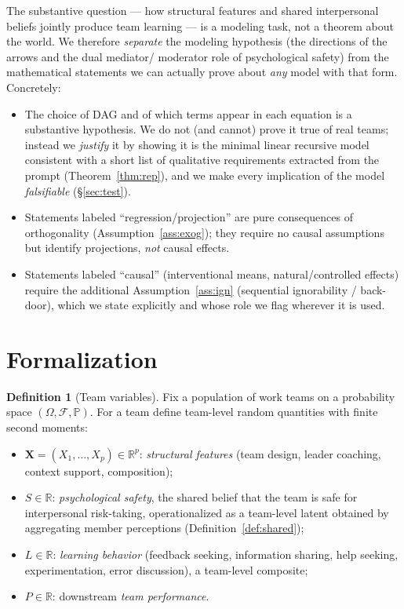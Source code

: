 \documentclass{amsart}
\theoremstyle{definition}
\newtheorem{definition}{Definition}
\theoremstyle{plain}
\begin{document}
The substantive question --- how structural features and shared interpersonal beliefs jointly
produce team learning --- is a modeling task, not a theorem about the world. We therefore
\emph{separate} the modeling hypothesis (the directions of the arrows and the dual mediator/
moderator role of psychological safety) from the mathematical statements we can actually
prove about \emph{any} model with that form. Concretely:
\begin{itemize}
\item The choice of DAG and of which terms appear in each equation is a substantive
hypothesis. We do not (and cannot) prove it true of real teams; instead we
\emph{justify} it by showing it is the minimal linear recursive model consistent with a short
list of qualitative requirements extracted from the prompt (Theorem~\ref{thm:rep}), and we
make every implication of the model \emph{falsifiable} (\S\ref{sec:test}).
\item Statements labeled ``regression/projection'' are pure consequences of
orthogonality (Assumption~\ref{ass:exog}); they require no causal assumptions but
identify projections, \emph{not} causal effects.
\item Statements labeled ``causal'' (interventional means, natural/controlled effects)
require the additional Assumption~\ref{ass:ign} (sequential ignorability / back-door),
which we state explicitly and whose role we flag wherever it is used.
\end{itemize}

\section{Formalization}

\begin{definition}[Team variables]\label{def:vars}
Fix a population of work teams on a probability space $(\Omega,\mathcal F,\mathbb P)$. For a
team define team-level random quantities with finite second moments:
\begin{itemize}
\item $\bm X=(X_1,\dots,X_p)\in\mathbb R^p$: \emph{structural features} (team design, leader
coaching, context support, composition);
\item $S\in\mathbb R$: \emph{psychological safety}, the shared belief that the team is safe
for interpersonal risk-taking, operationalized as a team-level latent obtained by aggregating
member perceptions (Definition~\ref{def:shared});
\item $L\in\mathbb R$: \emph{learning behavior} (feedback seeking, information sharing, help
seeking, experimentation, error discussion), a team-level composite;
\item $P\in\mathbb R$: downstream \emph{team performance}.
\end{itemize}
\end{definition}
\end{document}
